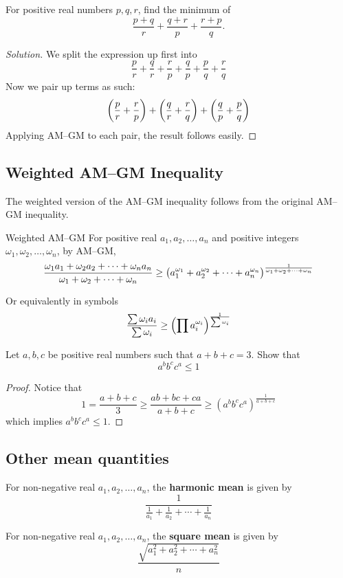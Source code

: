 \begin{exmp}{}{}
For positive real numbers $p,q,r$, find the minimum of 
\[ \frac{p+q}{r}+\frac{q+r}{p}+\frac{r+p}{q}. \]
\end{exmp}

\begin{proof}[Solution]
We split the expression up first into 
\[ \frac{p}{r}+\frac{q}{r}+\frac{r}{p}+\frac{q}{p}+\frac{p}{q}+\frac{r}{q} \]
Now we pair up terms as such:
\[ \left(\frac{p}{r}+\frac{r}{p}\right) + \left(\frac{q}{r}+\frac{r}{q}\right) + \left(\frac{q}{p}+\frac{p}{q}\right) \]
Applying AM--GM to each pair, the result follows easily.
\end{proof}

\subsection{Weighted AM--GM Inequality}
The weighted version of the AM--GM inequality follows from the original AM--GM inequality. 
\begin{thrm}{Weighted AM--GM}{}
For positive real $a_1,a_2,\dots,a_n$ and positive integers $\omega_1,\omega_2,\dots,\omega_n$, by AM--GM,
\begin{equation}
\frac{\omega_1a_1+\omega_2a_2+\cdots+\omega_na_n}{\omega_1+\omega_2+\cdots+\omega_n} \ge \left(a_1^{\omega_1}+a_2^{\omega_2}+\cdots+a_n^{\omega_n}\right)^\frac{1}{\omega_1+\omega_2+\cdots+\omega_n}
\end{equation}
\end{thrm}
Or equivalently in symbols
\[ \frac{\sum\omega_ia_i}{\sum\omega_i} \ge \left(\prod a_i^{\omega_i}\right)^\frac{1}{\sum\omega_i} \]

\begin{exmp}{}{}
Let $a, b, c$ be positive real numbers such that $a+b+c=3$. Show that
\[ a^bb^cc^a \le 1 \]
\end{exmp}
\begin{proof}
Notice that
\[ 1 = \frac{a+b+c}{3} \ge \frac{ab+bc+ca}{a+b+c} \ge (a^bb^cc^a)^\frac{1}{a+b+c} \]
which implies $a^bb^cc^a \le 1$.
\end{proof}

\subsection{Other mean quantities}
For non-negative real $a_1,a_2,\dots,a_n$, the \textbf{harmonic mean} is given by
\[ \frac{1}{\frac{1}{a_1}+\frac{1}{a_2}+\cdots+\frac{1}{a_n}} \]

For non-negative real $a_1,a_2,\dots,a_n$, the \textbf{square mean} is given by
\[ \frac{\sqrt{a_1^2+a_2^2+\cdots+a_n^2}}{n} \]

